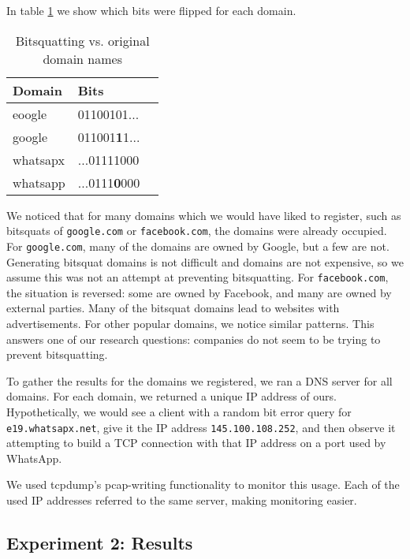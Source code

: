 \documentclass[conference]{IEEEtran}
\begin{document}
In table \ref{tab:bits} we show which bits were flipped for each domain.

\begin{table}[H]
  \centering
  \caption{Bitsquatting vs. original domain names}
  \label{tab:bits}
  \begin{tabular}{|l|l|l|}
    \hline
    \textbf{Domain}   & \textbf{Bits} \\ \hline
    eoogle   & 01100101... \\ \hline
    google   & 011001\textbf{1}1... \\ \hline
    whatsapx & ...01111000 \\ \hline
    whatsapp & ...0111\textbf{0}000 \\ \hline
   \end{tabular}
\end{table}

We noticed that for many domains which we would have liked to register, such as
bitsquats of \texttt{google.com} or \texttt{facebook.com}, the domains were
already occupied. For \texttt{google.com}, many of the domains are owned by
Google, but a few are not. Generating bitsquat domains is not difficult and
domains are not expensive, so we assume this was not an attempt at preventing
bitsquatting. For \texttt{facebook.com}, the situation is reversed: some are
owned by Facebook, and many are owned by external parties. Many of the bitsquat
domains lead to websites with advertisements. For other popular domains, we
notice similar patterns. This answers one of our research questions: companies
do not seem to be trying to prevent bitsquatting.

To gather the results for the domains we registered, we ran a DNS server for
all domains. For each domain, we returned a unique IP address of ours.
Hypothetically, we would see a client with a random bit error query for
\texttt{e19.whatsapx.net}, give it the IP address \texttt{145.100.108.252}, and
then observe it attempting to build a TCP connection with that IP address on a
port used by WhatsApp.

We used tcpdump's pcap-writing functionality to monitor this usage. Each of the
used IP addresses referred to the same server, making monitoring easier.


\subsection{Experiment 2: Results}
\end{document}
